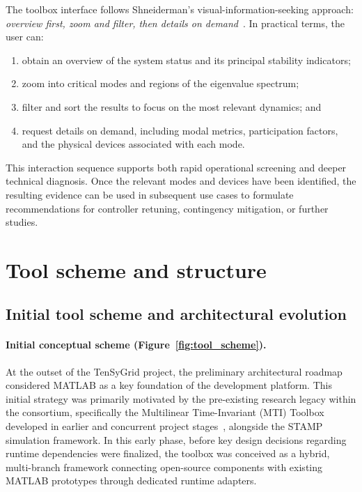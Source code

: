 The toolbox interface follows Shneiderman's visual-information-seeking approach: \textit{overview first, zoom and filter, then details on demand}~\cite{shneiderman1996eyes}. In practical terms, the user can:

\begin{enumerate}
  \item obtain an overview of the system status and its principal stability indicators;
  \item zoom into critical modes and regions of the eigenvalue spectrum;
  \item filter and sort the results to focus on the most relevant dynamics; and
  \item request details on demand, including modal metrics, participation factors, and the physical devices associated with each mode.
\end{enumerate}

This interaction sequence supports both rapid operational screening and deeper technical diagnosis. Once the relevant modes and devices have been identified, the resulting evidence can be used in subsequent use cases to formulate recommendations for controller retuning, contingency mitigation, or further studies.

\section{Tool scheme and structure}

\subsection{Initial tool scheme and architectural evolution}

\paragraph{Initial conceptual scheme (Figure~\ref{fig:tool_scheme}).}
At the outset of the TenSyGrid project, the preliminary architectural roadmap considered MATLAB as a key foundation of the development platform. This initial strategy was primarily motivated by the pre-existing research legacy within the consortium, specifically the Multilinear Time-Invariant (MTI) Toolbox developed in earlier and concurrent project stages~\cite{Kaufmann2025TenSyGridD11,Wong2025TenSyGridD21}, alongside the STAMP simulation framework. In this early phase, before key design decisions regarding runtime dependencies were finalized, the toolbox was conceived as a hybrid, multi-branch framework connecting open-source components with existing MATLAB prototypes through dedicated runtime adapters.

